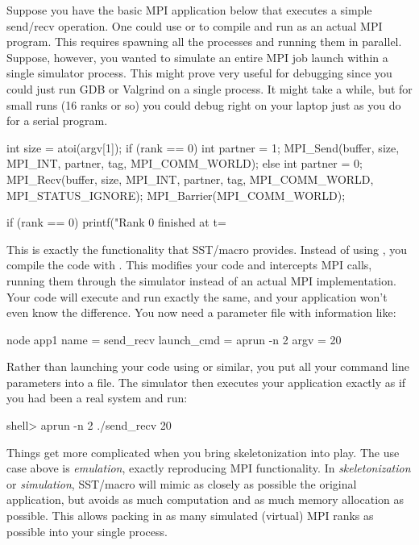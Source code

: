 Suppose you have the basic MPI application below that executes a simple send/recv operation.
One could use  or  to compile and run as an actual MPI program.
This requires spawning all the processes and running them in parallel.
Suppose, however, you wanted to simulate an entire MPI job launch within a single simulator process.
This might prove very useful for debugging since you could just run GDB or Valgrind on a single process.
It might take a while, but for small runs (16 ranks or so) you could debug right on your laptop just as you do for a serial program.

\begin{CppCode}
int size = atoi(argv[1]);
if (rank == 0){
 int partner = 1;
  MPI_Send(buffer, size, MPI_INT, partner, tag, MPI_COMM_WORLD);
} else {
  int partner = 0;
  MPI_Recv(buffer, size, MPI_INT, partner, tag, MPI_COMM_WORLD, MPI_STATUS_IGNORE);
}
MPI_Barrier(MPI_COMM_WORLD);

if (rank == 0){
  printf("Rank 0 finished at t=%
}
\end{CppCode}

This is exactly the functionality that SST/macro provides.
Instead of using , you compile the code with .
This modifies your code and intercepts MPI calls, running them through the simulator instead of an actual MPI implementation.
Your code will execute and run exactly the same, and your application won't even know the difference.
You now need a parameter file with information like:

\begin{ViFile}
node {
 app1 {
  name = send_recv
  launch_cmd = aprun -n 2
  argv = 20
 }
}
\end{ViFile}
Rather than launching your code using  or similar, you put all your command line parameters into a  file.
The simulator then executes your application exactly as if you had been a real system and run:

\begin{ShellCmd}
shell> aprun -n 2 ./send_recv 20
\end{ShellCmd}
Things get more complicated when you bring skeletonization into play.
The use case above is \emph{emulation}, exactly reproducing MPI functionality.
In \emph{skeletonization} or \emph{simulation}, SST/macro will mimic as closely as possible the original application,
but avoids as much computation and as much memory allocation as possible.
This allows packing in as many simulated (virtual) MPI ranks as possible into your single  process.

